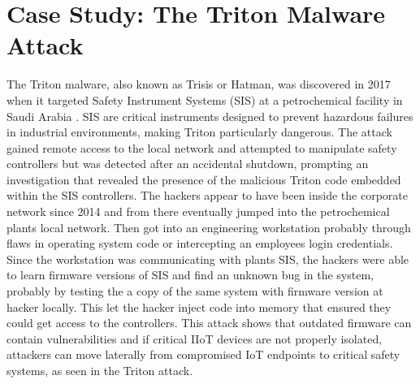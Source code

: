 \documentclass[article,a4paper]{IEEEtran}
\begin{document}
\section{ Case Study: The Triton Malware Attack}
The Triton malware, also known as Trisis or Hatman, was discovered in 2017 when it targeted Safety Instrument Systems (SIS) at a petrochemical facility in Saudi Arabia \cite{Triton,Triton2}. SIS are critical instruments designed to prevent hazardous failures in industrial environments, making Triton particularly dangerous. The attack gained remote access to the local network and attempted to manipulate safety controllers but was detected after an accidental shutdown, prompting an investigation that revealed the presence of the malicious Triton code embedded within the SIS controllers. 
\newline\newline
The hackers appear to have been inside the corporate network since 2014 and from there eventually jumped into the petrochemical plants local network. Then got into an engineering workstation probably through flaws in operating system code or intercepting an employees login credentials. Since the workstation was communicating with plants SIS, the hackers were able to learn firmware versions of SIS and find an unknown bug in the system, probably by testing the a copy of the same system with firmware version at hacker locally. This let the hacker inject code into memory that ensured they could get access to the controllers. 
\newline\newline
This attack shows that outdated firmware can contain vulnerabilities and if critical IIoT devices are not properly isolated, attackers can move laterally from compromised IoT endpoints to critical safety systems, as seen in the Triton attack. 
\end{document}
